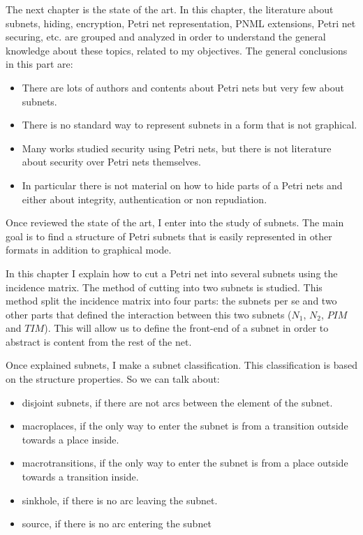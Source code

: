 The next chapter is the state of the art. In this chapter, the literature
about subnets, hiding, encryption, Petri net representation, PNML extensions,
Petri net securing, etc. are grouped and analyzed in order to understand the general knowledge about these topics, related to my objectives. The general conclusions in this part are:
\begin{itemize}
\item There are lots of authors and contents about Petri nets but very few
about subnets.
\item There is no standard way to represent
subnets in a form that is not graphical.
\item Many works studied security using Petri nets, but there is not literature
about security over Petri nets themselves.
\item In particular there is not material on how to hide parts of a Petri nets and either about integrity, authentication or non repudiation.
\end{itemize}
 
Once reviewed the state of the art, I enter into the study of subnets. The main goal is to find a structure of Petri subnets that is easily represented in other formats in addition to graphical mode.

In this chapter I explain how to cut a Petri net into several subnets using the incidence matrix. The method of cutting into two subnets is studied. This method split the incidence matrix into four parts: the subnets per se and two other parts that defined the interaction between this two subnets ($N_1$,
$N_2$, $PIM$ and $TIM$). This will allow us to define the front-end of a subnet in order to abstract is content from the rest of the net.

Once explained subnets, I make a subnet classification. This classification is based on the structure properties. So we can talk about:

\begin{itemize}
\item disjoint subnets, if there are not arcs between the element of the
subnet.
\item macroplaces, if the only way to enter the subnet is from a transition
outside towards a place inside.
\item macrotransitions, if the only way to enter the subnet is from a place
outside towards a transition inside.
\item sinkhole, if there is no arc leaving the subnet.
\item source, if there is no arc entering the subnet
\end{itemize}

